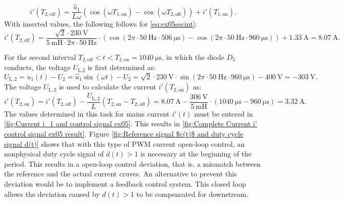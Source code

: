 \begin{solutionblock}
     \begin{equation}
        i'(T_\mathrm{2,off}) = \frac{\hat u_\mathrm{1}}{L \omega}(\cos (\omega T_\mathrm{1,on})- \cos(\omega T_\mathrm{2,off}))+ i'(T_\mathrm{1,on}).\label{eq:ex05secint}
    \end{equation}
    With inserted values, the following follows for \eqref{eq:ex05secint}:
    \begin{equation}
        i'(T_\mathrm{2,off}) = \frac{\sqrt{2}\cdot\SI{230}{\volt}}{\SI{5}{\milli\henry}\cdot 2\pi \cdot \SI{50}{\hertz}}\cdot (\cos(2\pi \cdot \SI{50}{\hertz}\cdot \SI{506}{\micro\s})-\cos(2\pi \cdot \SI{50}{\hertz} \cdot \SI{960}{\micro\s})) + \SI{1.33}{\ampere}= \SI{8.07}{\ampere}.
     \end{equation}

     For the second interval $T_\mathrm{2,off} < t < T_\mathrm{2,on} = \SI{1040}{\micro\s}$, in which the diode $D_\mathrm{5}$ conducts, the voltage $U_\mathrm{L.2}$ is first determined as:
     \begin{equation}
        U_\mathrm{L,2} = u_\mathrm{1}(t) - U_\mathrm{2}= \hat u_\mathrm{1} \sin(\omega t) - U_\mathrm{2} = \sqrt{2} \cdot \SI{230}{\volt} \cdot \sin(2\pi \cdot \SI{50}{\hertz}\cdot \SI{960}{\micro\s}) - \SI{400}{\volt} = -\SI{303}{\volt}.
    \end{equation}
    The voltage $U_\mathrm{L,2}$ is used to calculate the current  $i'(T_\mathrm{2,on})$ as:
    \begin{equation}
        i'(T_\mathrm{2,on}) = i'(T_\mathrm{2,off}) -\frac{ U_\mathrm{L,2}}{L}(T_\mathrm{2,on}-T_\mathrm{2,off}) = \SI{8.07}{\ampere} -\frac{\SI{306}{\volt}}{\SI{5}{\milli\henry}}\cdot (\SI{1040}{\micro\s}-\SI{960}{\micro\s}) = \SI{3.32}{\ampere}.
    \end{equation}
    The values determined in this task for mains current
    $i'(t)$ must be entered in \autoref{fig:Current i_1 and control signal ex05}. This results in \autoref{fig:Complete Current i' control signal ex05 result}. Figure \autoref{fig:Reference signal $c(t)$ and duty cycle signal d(t)} shows that with this type of PWM current open-loop control, an nonphysical duty cycle signal of $d(t) > 1$ is necessary at the beginning of the period. This results in a open-loop control deviation, that is, a mismatch between the reference and the actual current cruves. An alternative to prevent this deviation would be to implement a feedback control system. This closed loop allows the deviation caused by $d(t) > 1$ to be compensated for downstream.

    

\end{solutionblock}




